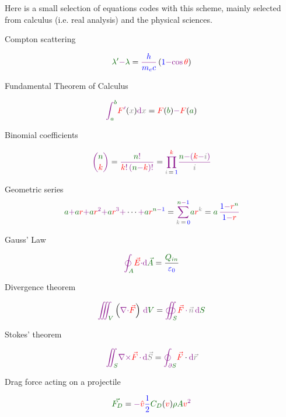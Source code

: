 \documentclass[12pt,letterpaper]{article}
\begin{document}
Here is a small selection of equations codes with this scheme,
mainly selected from calculus (i.e. real analysis) and the physical sciences.

Compton scattering

\[
\fv{\lambda'} \op{-} \fv{\lambda}
=
\op{\frac{\fc{h}}{\fc{m_e} \fc{c}}}
\left(
    \fc{1} \op{-} \op{\cos} \, \iv{\theta}
\right)
\]

Fundamental Theorem of Calculus

\[
\op{\int_{\fv{a}}^{\fv{b}}}
\iv{F}\op{'}(\bv{x})
\op{\mathrm{d}} \bv{x}
=
\iv{F}(\fv{b})
\op{-}
\iv{F}(\fv{a})
\]


Binomial coefficients

\[
\op{
  \binom{
    \fv{n}
  }{
    \iv{k}
  }
}
=
\op{
  \frac{
      \fv{n}\op{!}
  }{
      \iv{k} \op{!}
      \,
      (
        \fv{n} \op{-} \iv{k}
      )\op{!}
  }
}
=
\op{
  \prod_{
    \bv{i} \, \nt{=} \, \fc{1}
  }^{
    \iv{k}
  }
}
\op{
  \frac{
      \fv{n}
      \op{-}
      ( %
        \iv{k} \op{-} \bv{i}
      )
    }{
      \bv{i}
  }
}
\]

Geometric series
\[
\fv{a}
\op{+} \fv{a}\iv{r}
\op{+} \fv{a} \iv{r}^{\op{2}}
\op{+} \fv{a} \iv{r}^{\op{3}}
\op{+}
\cdots
\op{+} \fv{a} \iv{r}^{\op{\fv{n} \op{-} \fc{1}}}
=
\op{
  \sum_{
    \bv{k} \, \textcolor{black}{=} \, \fc{0}
  }^{
    \fv{n} \op{-} \fc{1}
  }
}
\fv{a} \iv{r}^{\bv{k}}
=
\fv{a}
\,
\op{
  \frac{
    \fc{1} \op{-} \iv{r}^{\fv{n}}
  }{
    \fc{1} \op{-} \iv{r}
  }
}
\]

Gauss' Law

\[
\op{\oint_{\fv{A}}}
\iv{\vec{E}}
\op{\cdot}
\op{\mathrm{d}}
\fv{\vec{A}}
=
\frac{
  \fv{Q_{in}}
  }{
  \fc{\varepsilon_0}
  }
\]

Divergence theorem

\[
\op{\iiint_{\fv{V}}}
  \left(
    \op{\nabla \cdot}
    \iv{\vec{F}}
  \right)
  \,
  \op{\mathrm{d}}
  \fv{V}
=
\op{\oiint_{\fv{S}}}
  \iv{\vec{F}}
  \,
  \op{\cdot}
  \,
  \bv{\vec{n}}
  \,
  \op{\mathrm{d}}
  \fv{S}
\]

Stokes' theorem

\[
\op{\iint_{\fv{S}}}
  \op{\nabla \times}
  \iv{\vec{F}}
  \,
  \op{\cdot}
  \,
  \op{\mathrm{d}}
  \fv{\bv{\vec{S}}}
=
\op{\oint_{\partial \fv{S}}}
  \iv{\vec{F}}
  \cdot
  \op{\mathrm{d}}
  \bv{\vec{r}}
\]

Drag force acting on a projectile

\[
\fv{\vec{F_D}}
=
\op{-}
\iv{\hat{v}}
\fc{\frac{1}{2}}
\fv{C_D}(
  \fv{\iv{v}}
)
\fv{\rho}
\fv{A}
\iv{v}^{\op{2}}
\]
\end{document}
